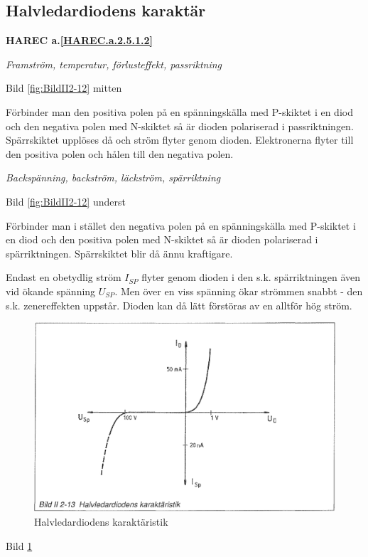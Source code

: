 \subsection{Halvledardiodens karaktär}
\textbf{HAREC a.\ref{HAREC.a.2.5.1.2}\label{myHAREC.a.2.5.1.2}}

\emph{Framström, temperatur, förlusteffekt, passriktning}

Bild \ref{fig:BildII2-12} mitten

Förbinder man den positiva polen på en spänningskälla med P-skiktet i en diod
och den negativa polen med N-skiktet så är dioden polariserad i passriktningen.
Spärrskiktet upplöses då och ström flyter genom dioden. Elektronerna flyter till
den positiva polen och hålen till den negativa polen.

\emph{Backspänning, backström, läckström, spärriktning}

Bild \ref{fig:BildII2-12} underst

Förbinder man i stället den negativa polen på en spänningskälla med P-skiktet i
en diod och den positiva polen med N-skiktet så är dioden polariserad i
spärriktningen. Spärrskiktet blir då ännu kraftigare.

Endast en obetydlig ström \(I_{SP}\) flyter genom dioden i den s.k.
spärriktningen även vid ökande spänning \(U_{SP}\). Men över en viss spänning
ökar strömmen snabbt - den s.k. zenereffekten uppstår. Dioden kan då lätt
förstöras av en alltför hög ström.

\begin{figure}
\includegraphics[width=\textwidth]{images/bild_2_2-13}
\caption{Halvledardiodens karaktäristik}
\label{fig:BildII2-13}
\end{figure}

Bild \ref{fig:BildII2-13}

